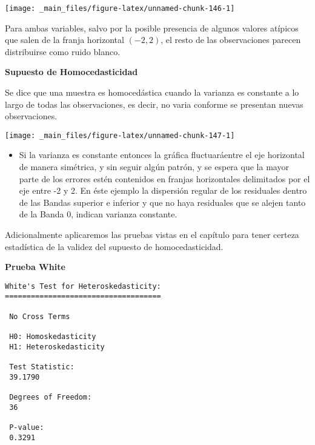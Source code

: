 \documentclass[
  a4paper,
  oneside,
  openany]{book}
\newenvironment{Shaded}{\begin{snugshade}}{\end{snugshade}}
\newcommand{\AttributeTok}[1]{\textcolor[rgb]{0.77,0.63,0.00}{#1}}
\newcommand{\DecValTok}[1]{\textcolor[rgb]{0.00,0.00,0.81}{#1}}
\newcommand{\FunctionTok}[1]{\textcolor[rgb]{0.00,0.00,0.00}{#1}}
\newcommand{\NormalTok}[1]{#1}
\newcommand{\OtherTok}[1]{\textcolor[rgb]{0.56,0.35,0.01}{#1}}
\newcommand{\SpecialCharTok}[1]{\textcolor[rgb]{0.00,0.00,0.00}{#1}}
\providecommand{\tightlist}{%
  \setlength{\itemsep}{0pt}\setlength{\parskip}{0pt}}
\begin{document}
\begin{center}\texttt{[image: \_main\_files/figure-latex/unnamed-chunk-146-1]} \end{center}

Para ambas variables, salvo por la posible presencia de algunos valores atípicos que salen de la franja horizontal \((-2,2)\), el resto de las observaciones parecen distribuirse como ruido blanco.

\textbf{Supuesto de Homocedasticidad}

Se dice que una muestra es homocedástica cuando la varianza es constante a lo largo de todas las observaciones, es decir, no varia conforme se presentan nuevas observaciones.

\begin{center}\texttt{[image: \_main\_files/figure-latex/unnamed-chunk-147-1]} \end{center}

\begin{itemize}
\tightlist
\item
  Si la varianza es constante entonces la gráfica fluctuaráentre el eje horizontal de manera simétrica, y sin seguir algún patrón, y se espera que la mayor parte de los errores estén contenidos en franjas horizontales delimitados por el eje entre -2 y 2. En éste ejemplo la dispersión regular de los residuales dentro de las Bandas superior e inferior y que no haya residuales que se alejen tanto de la Banda 0, indican varianza constante.
\end{itemize}

Adicionalmente aplicaremos las pruebas vistas en el capítulo para tener certeza estadística de la validez del supuesto de homocedasticidad.

\textbf{Prueba White}

\begin{Shaded}
\end{Shaded}

\begin{verbatim}
White's Test for Heteroskedasticity:
==================================== 

 No Cross Terms

 H0: Homoskedasticity
 H1: Heteroskedasticity

 Test Statistic:
 39.1790 

 Degrees of Freedom:
 36 

 P-value:
 0.3291 
\end{verbatim}
\end{document}
